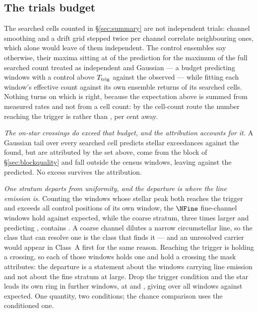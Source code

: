 \subsection{The trials budget}

The searched cells counted in \S\ref{sec:summary} are not independent
trials: channel smoothing and a drift grid stepped twice per channel
correlate neighbouring ones, which alone would leave \StGridFrac{} of them
independent. The control ensembles say otherwise, their maxima sitting at
\CtrlMaxRatioMed{} of the prediction for the maximum of the full searched
count treated as independent and Gaussian --- a budget predicting
\NCtrlWinExp{} windows with a control above $T_{\rm trig}$ against the
\NCtrlWinObs{} observed --- while fitting each window's effective count
against its own ensemble returns \StNindFrac{} of its searched cells. Nothing
turns on which is right, because the expectation above is summed from measured
rates and not from a cell count: by the cell-count route the number reaching
the trigger is \StExpModel{} rather than \CeExpTrig, \StModelAgreePct{} per
cent away.

\emph{The on-star crossings do exceed that budget, and the attribution
accounts for it.} A Gaussian tail over every searched cell predicts
\CellExpect{} stellar exceedances against the \NCross{} found, but \MkAttr{}
are attributed by the set above, \EvNCrossFlag{} come from the block of
\S\ref{sec:blockquality} and \CeNTailCross{} fall outside the census windows,
leaving \CeObs{} against the \CeExpSurv{} predicted. No excess survives the
attribution.

\emph{One stratum departs from uniformity, and the departure is where the
line emission is.} Counting the windows whose stellar peak both reaches the
trigger and exceeds all \NCtrl{} control positions of its own window, the
$\NFine$ fine-channel windows hold \NStageOneFine{} against
\ExpStageOneFine{} expected, while the coarse stratum, three times larger
and predicting \ExpStageOneCoarse, contains \NStageOneCoarse. A coarse
channel dilutes a narrow circumstellar line, so the class that can resolve
one is the class that finds it --- and an unresolved carrier would appear in
Class~A first for the same reason. Reaching the trigger is holding a
crossing, so each of those windows holds one and \CeFirstAttr{} hold a
crossing the mask attributes: the departure is a statement about the windows
carrying line emission and not about the fine stratum at large. Drop the
trigger condition and the star leads its own ring in \BkFirstBelow{} further
windows, at \BkFirstBelowTLo{} and \BkFirstBelowTHi, giving \NsrFirstObs{}
over all \NWindows{} windows against \NsrFirstExp{} expected. One quantity,
two conditions; the chance comparison uses the conditioned one.


